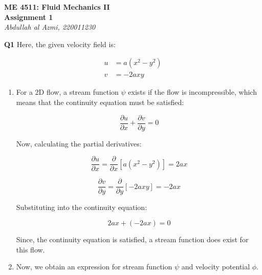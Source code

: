 \documentclass[12pt]{article}
\begin{document}
\begin{center}
	\textbf{\large ME 4511: Fluid Mechanics II} \\
	\vspace{0.5em}
	\textbf{Assignment 1} \\
	\vspace{0.5em}
	\textit{Abdullah al Azmi, 220011230}
	\vspace{1em}
\end{center}

\noindent \textbf{Q1} Here, the given velocity field is:

\begin{align}
	u & = a(x^2-y^2) \\
	v & = -2axy
\end{align}

\begin{enumerate}

	\item[\textbf{(i)}] For a 2D flow, a stream function $\psi$ exists if the flow is incompressible, which means that the continuity equation must be satisfied:

	      \begin{equation*}
		      \frac{\partial u}{\partial x} + \frac{\partial v}{\partial y} = 0
	      \end{equation*}

	      Now, calculating the partial derivatives:

	      \begin{equation*}
		      \frac{\partial u}{\partial x} = \frac {\partial}{\partial x}[a(x^2-y^2)] = 2ax
	      \end{equation*}

	      \begin{equation*}
		      \frac{\partial v}{\partial y} = \frac{\partial}{\partial y}[-2axy] = -2ax
	      \end{equation*}

	      Substituting into the continuity equation:

	      \begin{equation*}
		      2ax + (-2ax) = 0
	      \end{equation*}

	      Since, the continuity equation is satisfied, a stream function does exist for this flow.

	      \vspace{1em}

	\item[\textbf{(ii)}] Now, we obtain an expression for stream function $\psi$ and velocity potential $\phi$.


\end{enumerate}
\end{document}
